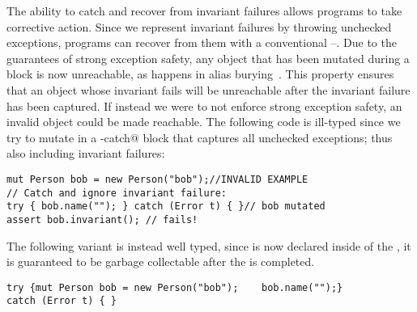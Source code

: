 The ability to catch and recover from invariant failures allows programs to take corrective action.
Since we represent invariant failures by throwing unchecked exceptions, programs can recover from them with a conventional \Q@try@--\Q@catch@.
	Due to the guarantees of strong exception safety, any object that has been mutated during a \Q@try@ block is now unreachable, as happens in alias burying~\cite{boyland2001alias}.
 This property ensures that an object whose invariant fails will be unreachable after the invariant failure has been captured. %
If instead we were to not enforce strong exception safety, an invalid object could be made reachable.
The following code is ill-typed since we try to mutate \Q@bob@ in a \Q@try-catch@ block that captures all unchecked exceptions; thus also including invariant failures:
\begin{lstlisting}[morekeywords={assert}]
mut Person bob = new Person("bob");//INVALID EXAMPLE
// Catch and ignore invariant failure:
try { bob.name(""); } catch (Error t) { }// bob mutated
assert bob.invariant(); // fails!
\end{lstlisting}
The following variant is instead well typed, since \Q@bob@ is now declared inside of the \Q@try@, it is guaranteed to be garbage collectable after the \Q@try@ is completed.
\begin{lstlisting}[morekeywords={assert}]
try {mut Person bob = new Person("bob");    bob.name("");} 
catch (Error t) { }
\end{lstlisting}



